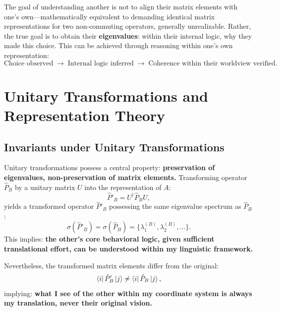 ﻿\documentclass[11pt,a4paper]{article}
\begin{document}
The goal of understanding another is not to align their matrix elements with one's own---mathematically equivalent to demanding identical matrix representations for two non-commuting operators, generally unrealizable. Rather, the true goal is to obtain their \textbf{eigenvalues}: within their internal logic, why they made this choice. This can be achieved through reasoning within one's own representation:
\begin{equation}
\text{Choice observed}
\;\longrightarrow\;
\text{Internal logic inferred}
\;\longrightarrow\;
\text{Coherence within their worldview verified}.
\label{eq:inference}
\end{equation}

\section{Unitary Transformations and Representation Theory}

\subsection{Invariants under Unitary Transformations}

Unitary transformations possess a central property: \textbf{preservation of eigenvalues, non-preservation of matrix elements.} Transforming operator $\hat{P}_B$ by a unitary matrix $U$ into the representation of $A$:
\begin{equation}
\hat{P}'_B = U^\dagger \hat{P}_B U,
\label{eq:unitary}
\end{equation}
yields a transformed operator $\hat{P}'_B$ possessing the same eigenvalue spectrum as $\hat{P}_B$:
\begin{equation}
\sigma(\hat{P}'_B) = \sigma(\hat{P}_B) = \{\lambda^{(B)}_1, \lambda^{(B)}_2, \dots\}.
\label{eq:spectrum}
\end{equation}
This implies: \textbf{the other's core behavioral logic, given sufficient translational effort, can be understood within my linguistic framework.}

Nevertheless, the transformed matrix elements differ from the original:
\begin{equation}
\bra{i}\hat{P}'_B\ket{j} \neq \bra{i}\hat{P}_B\ket{j},
\label{eq:matrix_diff}
\end{equation}
implying: \textbf{what I see of the other within my coordinate system is always my translation, never their original vision.}
\end{document}
